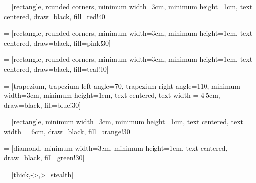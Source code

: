 \usepackage[utf8]{inputenc}
\usepackage{xcolor}
\usepackage{tikz} 
\usetikzlibrary{positioning,calc}
\usepackage{graphicx}
\usepackage{hyperref}
\usepackage{amsmath}
\usepackage{listings}
\usepackage{fontawesome}
\usepackage[center]{caption}
\usepackage{makecell}
\usepackage{adjustbox}
\usepackage{multirow}
\usepackage{multicol}
\usepackage{xspace} 
\usepackage{etoolbox} %
\usepackage{booktabs} %
\usepackage{pgfgantt} %


\newcommand*{\ClipSep}{0.06cm} %
\newcommand{\E}{\mathrm{e}\,} %
\newcommand{\ud}{\mathrm{d}}
\lstset{numbers=left, numberstyle=\tiny, stepnumber=1,firstnumber=1,breaklines=true,
    numbersep=5pt,language=Python,
    stringstyle=\ttfamily,
    basicstyle=\footnotesize, 
    showstringspaces=false
}

\captionsetup{labelformat=empty}

%



\usepackage{tikz}
\usetikzlibrary{shapes.geometric, arrows}

 = [rectangle, rounded corners, minimum width=3cm, minimum height=1cm, text centered, draw=black, fill=red!40]

 = [rectangle, rounded corners, minimum width=3cm, minimum height=1cm, text centered, draw=black, fill=pink!30]

 = [rectangle, rounded corners, minimum width=3cm, minimum height=1cm, text centered, draw=black, fill=teal!10]

 = [trapezium, trapezium left angle=70, trapezium right angle=110, minimum width=3cm, minimum height=1cm, text centered, text width = 4.5cm, draw=black, fill=blue!30]

 = [rectangle, minimum width=3cm, minimum height=1cm, text centered, text width = 6cm, draw=black, fill=orange!30]

 = [diamond, minimum width=3cm, minimum height=1cm, text centered, draw=black, fill=green!30]

 = [thick,->,>=stealth]





